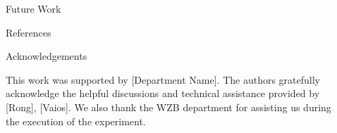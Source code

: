 \documentclass[final]{beamer}
\newlength{\sepwid}
\newlength{\onecolwid}
\begin{document}
\begin{frame}
\begin{columns}[t]
\begin{column}{\onecolwid}
\begin{exampleblock}{Future Work}
\end{exampleblock}


\begin{exampleblock}{References}

\nocite{*} %
\small{
\vspace{1cm}}
\end{exampleblock}






\begin{block}{Acknowledgements}

This work was supported by [Department Name]. The authors gratefully acknowledge the helpful discussions and technical assistance provided by [Rong], [Vaios].
We also thank the WZB department for assisting us during the execution of the experiment.

\end{block}


\end{column} %

\begin{column}{\sepwid}\end{column} %

\end{columns} %

\end{frame} %
\end{document}
